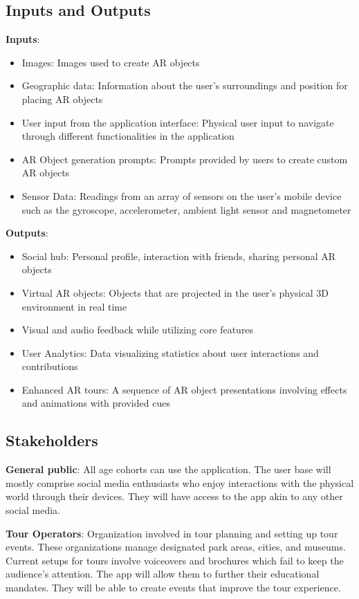 \documentclass{article}
\begin{document}
\subsection{Inputs and Outputs}

\textbf{Inputs}:
\begin{itemize}
  \item Images: Images used to create AR objects
  \item Geographic data: Information about the user’s surroundings and position for placing AR objects
  \item User input from the application interface: Physical user input to navigate through different functionalities in the application
  \item AR Object generation prompts: Prompts provided by users to create custom AR objects
  \item Sensor Data: Readings from an array of sensors on the user’s mobile device such as the gyroscope, accelerometer, ambient light sensor and magnetometer
\end{itemize}

\begin{flushleft}
\textbf{Outputs}:
\end{flushleft}
\begin{itemize}
  \item Social hub: Personal profile, interaction with friends, sharing personal AR objects
  \item Virtual AR objects: Objects that are projected in the user’s physical 3D environment in real time
  \item Visual and audio feedback while utilizing core features
  \item User Analytics: Data visualizing statistics about user interactions and contributions
  \item Enhanced AR tours: A sequence of AR object presentations involving effects and animations with provided cues
\end{itemize}

\subsection{Stakeholders}

\begin{flushleft}
 \textbf{General public}: All age cohorts can use the application. The user base will mostly comprise social media enthusiasts who enjoy interactions with the physical world through their devices. They will have access to the app akin to any other social media.\linebreak

 \textbf{Tour Operators}: Organization involved in tour planning and setting up tour events. These organizations manage designated park areas, cities, and museums. Current setups for tours involve voiceovers and brochures which fail to keep the audience’s attention. The app will allow them to further their educational mandates. They will be able to create events that improve the tour experience.
\end{flushleft}
\end{document}

